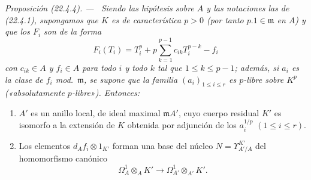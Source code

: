 \documentclass[10pt,oneside]{book}
\makeatletter
\newcommand{\setmanualcurrentlabel}[1]{\def\@currentlabel{#1}}
\newcommand{\oldpage}[2][]{%
  \setcounter{footnote}{0}%
  \marginpar{\scriptsize\textbf{#1}~|~#2}\ignorespaces}
\newenvironment{proposition}[1][]{%
  \setmanualcurrentlabel{#1}\par\medskip\noindent\itshape Proposición (#1). ---\ }{\par}
\providecommand{\setmin}{-}%
\makeatother
\begin{document}
\begin{proposition}[22.4.4]
\label{0.22.4.4-es}
Siendo las hipótesis sobre $A$ y las notaciones las de \textup{(22.4.1)}, supongamos
que $K$ es de característica $p>0$ (por tanto $p.1\in\mathfrak m$ en
$A$) y que los $F_i$ son de la forma
\begin{equation}
\label{0.22.4.4.1-es}
  F_i(T_i)=T_i^p+p\sum_{k=1}^{p-1}c_{ik}T_i^{p-k}\setmin f_i
  \tag{22.4.4.1}
\end{equation}
con $c_{ik}\in A$ y $f_i\in A$ para todo $i$ y todo $k$ tal que
$1\leqslant k\leqslant p\setmin 1$; además, si $a_i$ es la clase de $f_i$
\textup{mod.}~$\mathfrak m$, se supone que la familia $(a_i)_{1\leqslant i\leqslant r}$
es $p$-libre sobre $K^p$ \textup{(«absolutamente $p$-libre»)}. Entonces:
\begin{enumerate}
  \item[\textup{(i)}] $A'$ es un anillo local, de ideal maximal $\mathfrak mA'$,
  cuyo cuerpo residual $K'$ es isomorfo a la extensión de $K$ obtenida por
  adjunción de los $a_i^{1/p}$ $(1\leqslant i\leqslant r)$.

  \oldpage[0\textsubscript{IV-1}]{195}

  \item[\textup{(ii)}] Los elementos $d_Af_i\otimes1_{K'}$ forman una base del núcleo
  $N=\Upsilon^{K'}_{A'/A}$ del homomorfismo canónico
  \[
    \Omega^1_A\otimes_AK'\longrightarrow
    \Omega^1_{A'}\otimes_{A'}K'.
  \]
\end{enumerate}
\end{proposition}
\end{document}
